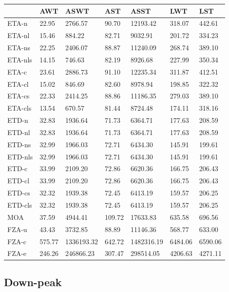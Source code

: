 \documentclass{UoYCSproject}
\begin{document}
\begin{tabular}{l | l l l l l l}
	& AWT & ASWT & AST & ASST & LWT & LST \\
	\hline
	ETA-n & 22.95 & 2766.57 & 90.70 & 12193.42 & 318.07 & 442.61 \\
	ETA-nl & 15.46 & 884.22 & 82.71 & 9032.91 & 201.72 & 334.23 \\
	ETA-ns & 22.25 & 2406.07 & 88.87 & 11240.09 & 268.74 & 389.10 \\
	ETA-nls & 14.15 & 746.63 & 82.19 & 8926.68 & 227.99 & 350.34 \\
	ETA-c & 23.61 & 2886.73 & 91.10 & 12235.34 & 311.87 & 412.51 \\
	ETA-cl & 15.02 & 846.69 & 82.60 & 8978.94 & 198.85 & 322.32 \\
	ETA-cs & 22.33 & 2414.25 & 88.86 & 11186.35 & 279.03 & 389.10 \\
	ETA-cls & 13.54 & 670.57 & 81.44 & 8724.48 & 174.11 & 318.16 \\
	\hline
	ETD-n & 32.83 & 1936.64 & 71.73 & 6364.71 & 177.63 & 208.59 \\
	ETD-nl & 32.83 & 1936.64 & 71.73 & 6364.71 & 177.63 & 208.59 \\
	ETD-ns & 32.99 & 1966.03 & 72.71 & 6434.30 & 145.91 & 199.61 \\
	ETD-nls & 32.99 & 1966.03 & 72.71 & 6434.30 & 145.91 & 199.61 \\
	ETD-c & 33.99 & 2109.20 & 72.86 & 6620.36 & 166.75 & 206.43 \\
	ETD-cl & 33.99 & 2109.20 & 72.86 & 6620.36 & 166.75 & 206.43 \\
	ETD-cs & 32.32 & 1939.38 & 72.45 & 6413.19 & 159.57 & 206.25 \\
	ETD-cls & 32.32 & 1939.38 & 72.45 & 6413.19 & 159.57 & 206.25 \\
	\hline
	MOA & 37.59 & 4944.41 & 109.72 & 17633.83 & 635.58 & 696.56 \\
	\hline
	FZA-u & 43.43 & 3732.85 & 88.89 & 11146.36 & 568.77 & 633.00 \\
	FZA-c & 575.77 & 1336193.32 & 642.72 & 1482316.19 & 6484.06 & 6590.06 \\
	FZA-e & 246.26 & 246866.23 & 307.47 & 298514.05 & 4206.63 & 4271.11
\end{tabular}

\subsection{Down-peak}
\end{document}
